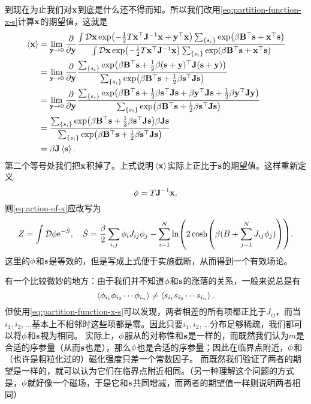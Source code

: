 \documentclass[hyperref, UTF8, a4paper]{ctexart}
\newcommand*{\ee}{\mathrm{e}}
\newcommand*{\fd}[1]{\mathop{}\!\mathcal{D} #1}
\begin{document}
到现在为止我们对$\vb{x}$到底是什么还不得而知。所以我们改用\eqref{eq:partition-function-x-s}计算$\vb{x}$的期望值，这就是
\[
    \begin{aligned}
        \expval*{\vb{x}} &= \lim_{\vb{y} \to 0} \pdv{\vb{y}} \frac{\int \fd{\vb{x}} \exp(-\frac{1}{2} T \vb{x}^\top \vb{J}^{-1} \vb{x} + \vb{y}^\top \vb{x}) \sum_{\{s_i\}} \exp(\beta \vb{B}^\top \vb{s} + \vb{x}^\top \vb{s})}{\int \fd{\vb{x}} \exp(-\frac{1}{2} T \vb{x}^\top \vb{J}^{-1} \vb{x}) \sum_{\{s_i\}} \exp(\beta \vb{B}^\top \vb{s} + \vb{x}^\top \vb{s})} \\
        &= \lim_{\vb{y} \to 0} \pdv{\vb{y}} \frac{\sum_{\{s_i\}} \exp(\beta \vb{B}^\top \vb{s} + \frac{1}{2} \beta (\vb{s} + \vb{y})^\top \vb{J} (\vb{s} + \vb{y}))}{\sum_{\{s_i\}} \exp(\beta \vb{B}^\top \vb{s} + \frac{1}{2} \beta \vb{s}^\top \vb{J} \vb{s})} \\
        &= \lim_{\vb{y} \to 0} \pdv{\vb{y}} \frac{\sum_{\{s_i\}} \exp(\beta \vb{B}^\top \vb{s} + \frac{1}{2} \beta \vb{s}^\top \vb{J} \vb{s} + \beta \vb{y}^\top \vb{J} \vb{s} + \frac{1}{2} \beta \vb{y}^\top \vb{J} \vb{y} )}{\sum_{\{s_i\}} \exp(\beta \vb{B}^\top \vb{s} + \frac{1}{2} \beta \vb{s}^\top \vb{J} \vb{s})} \\
        &= \frac{\sum_{\{s_i\}} \exp(\beta \vb{B}^\top \vb{s} + \frac{1}{2} \beta \vb{s}^\top \vb{J} \vb{s}) \beta \vb{J} \vb{s}}{\sum_{\{s_i\}} \exp(\beta \vb{B}^\top \vb{s} + \frac{1}{2} \beta \vb{s}^\top \vb{J} \vb{s})} \\
        &= \beta \vb{J} \expval*{\vb{s}}.
    \end{aligned}
\]
第二个等号处我们把$\vb{x}$积掉了。上式说明$\expval*{\vb{x}}$实际上正比于$\vb{s}$的期望值。这样重新定义
\begin{equation}
    \vb{\phi} = T \vb{J}^{-1} \vb{x},
\end{equation}
则\eqref{eq:action-of-x}应改写为
\begin{equation}
    Z = \int \fd{\vb{\phi}} \ee^{-\tilde{S}}, \quad \tilde{S} = \frac{\beta}{2} \sum_{i,j} \phi_i J_{ij} \phi_j - \sum_{i=1}^N \ln(2\cosh(\beta(B + \sum_{j=1}^N J_{ij} \phi_j))).
    \label{eq:action-of-phi}
\end{equation}
这里的$\vb{\phi}$和$\vb{s}$是等效的，但是写成上式便于实施截断，从而得到一个有效场论。

有一个比较微妙的地方：由于我们并不知道$\vb{\phi}$和$\vb{s}$的涨落的关系，一般来说总是有
\[
    \expval{\phi_{i_1} \phi_{i_2} \cdots \phi_{i_n}} \neq \expval{s_{i_1} s_{i_2} \cdots s_{i_n}}.
\]
但使用\eqref{eq:partition-function-x-s}可以发现，两者相差的所有项都正比于$J_{ij}$，而当$i_1, i_2, \ldots$基本上不相邻时这些项都是零。因此只要$i_1, i_2, \ldots$分布足够稀疏，我们都可以将$\vb{\phi}$和$\vb{s}$视为相同。
实际上，$\vb{\phi}$服从的对称性和$\vb{s}$是一样的，而既然我们认为$m$是合适的序参量（从而$\vb{s}$也是），那么$\vb{\phi}$也是合适的序参量；因此在临界点附近，$\vb{\phi}$和（也许是粗粒化过的）磁化强度只差一个常数因子。
而既然我们验证了两者的期望是一样的，就可以认为它们在临界点附近相同。（另一种理解这个问题的方式是，$\vb{\phi}$就好像一个磁场，于是它和$\vb{s}$共同增减，而两者的期望值一样则说明两者相同）
\end{document}
